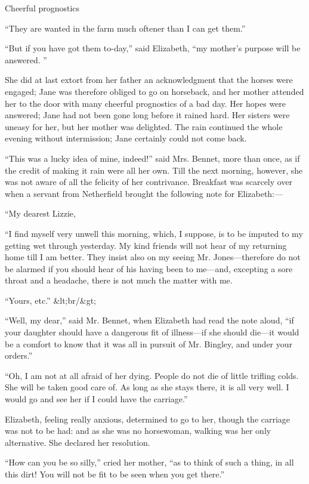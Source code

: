 \documentclass[10pt]{book}
\begin{document}
     Cheerful prognostics
    

   “They are wanted in the farm much oftener than I can get them.”
  

   “But if you have got them to-day,” said Elizabeth, “my mother’s purpose
will be answered.
   ”
  

   She did at last extort from her father an acknowledgment that the horses
were engaged; Jane was therefore obliged to go on horseback, and her
mother attended her to the door with many cheerful prognostics of a bad
day. Her hopes were answered; Jane had not been gone long before it
rained hard. Her sisters were uneasy for her, but her mother was
delighted. The rain continued the whole evening without intermission;
Jane certainly could not come back.
  

   “This was a lucky idea of mine, indeed!” said Mrs. Bennet, more than
once, as if the credit of making it rain were all her own. Till the next
morning, however, she was not aware of all the felicity of her
contrivance. Breakfast was scarcely over when a servant from Netherfield
brought the following note for Elizabeth:—
  

    “My dearest Lizzie,
   

    “I find myself very unwell this morning, which, I suppose, is to be
imputed to my getting wet through yesterday. My kind friends will
not hear of my returning home till I am better. They insist also on
my seeing Mr. Jones—therefore do not be alarmed if you should hear
of his having been to me—and, excepting a sore throat and a
headache, there is not much the matter with me.
   

    “Yours, etc.”
    &lt;br/&gt;

   “Well, my dear,” said Mr. Bennet, when Elizabeth had read the note
aloud, “if your daughter should have a dangerous fit of illness—if she
should die—it would be a comfort to know that it was all in pursuit of
Mr. Bingley, and under your orders.”
  

   “Oh, I am not at all afraid of her dying. People do
   not die of little
trifling colds. She will be taken good care of. As long as she stays
there, it is all very well. I would go and see her if I could have the
carriage.”
  

   Elizabeth, feeling really anxious, determined to go to her, though the
carriage was not to be had: and as she was no horsewoman, walking was
her only alternative. She declared her resolution.
  

   “How can you be so silly,” cried her mother, “as to think of such a
thing, in all this dirt! You will not be fit to be seen when you get
there.”
  
\end{document}
